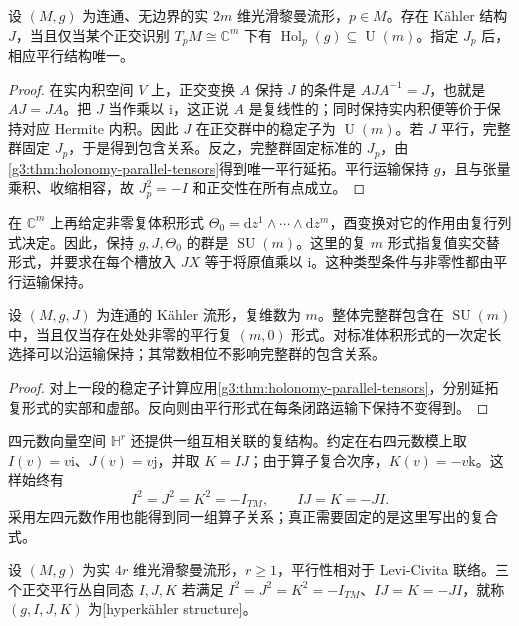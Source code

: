 \begin{proposition}\label{g3:prop:unitary-holonomy-parallel-complex}
	设 \((M,g)\) 为连通、无边界的实 \(2m\) 维光滑黎曼流形，\(p\in M\)。存在 Kähler 结构 \(J\)，当且仅当某个正交识别 \(T_pM\cong\mathbb C^m\) 下有 \(\operatorname{Hol}_p(g)\subseteq\operatorname U(m)\)。指定 \(J_p\) 后，相应平行结构唯一。
\end{proposition}
\begin{proof}
	在实内积空间 \(V\) 上，正交变换 \(A\) 保持 \(J\) 的条件是 \(AJA^{-1}=J\)，也就是 \(AJ=JA\)。把 \(J\) 当作乘以 \(\mathrm i\)，这正说 \(A\) 是复线性的；同时保持实内积便等价于保持对应 Hermite 内积。因此 \(J\) 在正交群中的稳定子为 \(\operatorname U(m)\)。若 \(J\) 平行，完整群固定 \(J_p\)，于是得到包含关系。反之，完整群固定标准的 \(J_p\)，由\cref{g3:thm:holonomy-parallel-tensors}得到唯一平行延拓。平行运输保持 \(g\)，且与张量乘积、收缩相容，故 \(J_p^2=-I\) 和正交性在所有点成立。
\end{proof}

\ProseParagraphBreak

在 \(\mathbb C^m\) 上再给定非零复体积形式 \(\Theta_0=\mathrm dz^1\wedge\cdots\wedge\mathrm dz^m\)，酉变换对它的作用由复行列式决定。因此，保持 \(g,J,\Theta_0\) 的群是 \(\operatorname{SU}(m)\)。这里的复 \(m\) 形式指复值实交替形式，并要求在每个槽放入 \(JX\) 等于将原值乘以 \(\mathrm i\)。这种类型条件与非零性都由平行运输保持。

\begin{corollary}\label{g3:cor:special-unitary-parallel-volume}
	设 \((M,g,J)\) 为连通的 Kähler 流形，复维数为 \(m\)。整体完整群包含在 \(\operatorname{SU}(m)\) 中，当且仅当存在处处非零的平行复 \((m,0)\) 形式。对标准体积形式的一次定长选择可以沿运输保持；其常数相位不影响完整群的包含关系。
\end{corollary}
\begin{proof}
	对上一段的稳定子计算应用\cref{g3:thm:holonomy-parallel-tensors}，分别延拓复形式的实部和虚部。反向则由平行形式在每条闭路运输下保持不变得到。
\end{proof}

\ProseParagraphBreak

四元数向量空间 \(\mathbb H^r\) 还提供一组互相关联的复结构。约定在右四元数模上取 \(I(v)=v\mathrm i\)、\(J(v)=v\mathrm j\)，并取 \(K=IJ\)；由于算子复合次序，\(K(v)=-v\mathrm k\)。这样始终有
\[
	I^2=J^2=K^2=-I_{TM},\qquad IJ=K=-JI.
\]
采用左四元数作用也能得到同一组算子关系；真正需要固定的是这里写出的复合式。

\begin{definition}\label{g3:def:hyperkahler-structure}
	设 \((M,g)\) 为实 \(4r\) 维光滑黎曼流形，\(r\ge1\)，平行性相对于 Levi-Civita 联络。三个正交平行丛自同态 \(I,J,K\) 若满足 \(I^2=J^2=K^2=-I_{TM}\)、\(IJ=K=-JI\)，就称 \((g,I,J,K)\) 为[hyperkähler structure]。
\end{definition}

